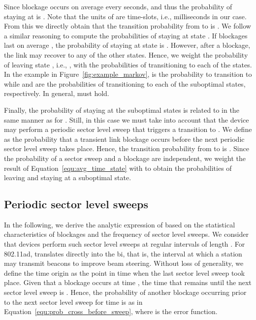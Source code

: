 \documentclass{article}
\begin{document}
Since blockage occurs on average every  seconds,  and thus the probability of staying at  is . Note that the units of  are time-slots, i.e., milliseconds in our case. From this we directly obtain that the transition probability from  to  is . We follow a similar reasoning to compute the probabilities of staying at state . If blockages last on average , the probability of staying at state  is . However, after a blockage, the link may recover to any of the other  states. Hence, we weight the probability of leaving state , i.e., , with the probabilities of transitioning to each of the states. In the example in Figure~\ref{fig:example_markov},  is the probability to transition to  while  and  are the probabilities of transitioning to each of the suboptimal states, respectively. In general,  must hold.



Finally, the probability of staying at the suboptimal states is related to  in the same manner as for . Still, in this case we must take into account that the device may perform a periodic sector level sweep that triggers a transition to . We define  as the probability that a transient link blockage occurs before the next periodic sector level sweep takes place. Hence, the transition probability from  to  is . Since the probability of a sector sweep and a blockage are independent, we weight the result of Equation~\ref{equ:avg_time_state} with  to obtain the probabilities of leaving and staying at a suboptimal state.



\subsection{Periodic sector level sweeps}

In the following, we derive the analytic expression of  based on the statistical characteristics of blockages and the frequency of sector level sweeps. We consider that devices perform such sector level sweeps at regular intervals of length . For 802.11ad,  translates directly into the \ac{bi}, that is, the interval at which a station may transmit beacons to improve beam steering. Without loss of generality, we define the time origin  as the point in time when the last sector level sweep took place. Given that a blockage occurs at time , the time that remains until the next sector level sweep is . Hence, the probability of another blockage  occurring prior to the next sector level sweep for time  is as in Equation~\ref{equ:prob_cross_before_sweep}, where  is the error function.
\end{document}
